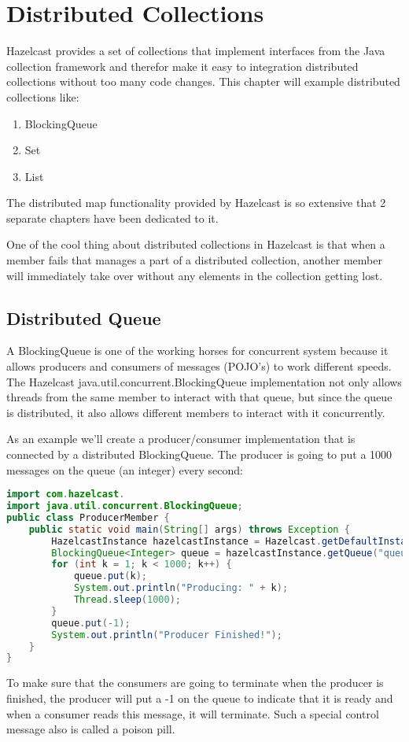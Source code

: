 \chapter{Distributed Collections}
Hazelcast provides a set of collections that implement interfaces from the Java collection framework and therefor make it easy to integration distributed collections without too many code changes. This chapter will example distributed collections like:
\begin{enumerate}
\item BlockingQueue
\item Set
\item List
\end{enumerate}
The distributed map functionality provided by Hazelcast is so extensive that 2 separate chapters have been dedicated to it. 

One of the cool thing about distributed collections in Hazelcast is that when a member fails that manages a part of a distributed collection, another member will immediately take over without any elements in the collection getting lost.

\section{Distributed Queue}
A BlockingQueue is one of the working horses for concurrent system because it allows producers and consumers of messages (POJO's) to work different speeds. The Hazelcast java.util.concurrent.BlockingQueue implementation not only allows threads from the same member to interact with that queue, but since the queue is distributed, it also allows different members to interact with it concurrently.

As an example we'll create a producer/consumer implementation that is connected by a distributed BlockingQueue. The producer is going to put a 1000 messages on the queue (an integer) every second:
\begin{lstlisting}[language=java]
import com.hazelcast.
import java.util.concurrent.BlockingQueue;
public class ProducerMember {
    public static void main(String[] args) throws Exception {
        HazelcastInstance hazelcastInstance = Hazelcast.getDefaultInstance();
        BlockingQueue<Integer> queue = hazelcastInstance.getQueue("queue");
        for (int k = 1; k < 1000; k++) {
            queue.put(k);
            System.out.println("Producing: " + k);
            Thread.sleep(1000);
        }
        queue.put(-1);
        System.out.println("Producer Finished!");
    }
}
\end{lstlisting}
To make sure that the consumers are going to terminate when the producer is finished, the producer will put a -1 on the queue to indicate that it is ready and when a consumer reads this message, it will terminate. Such a special control message also is called a poison pill.

